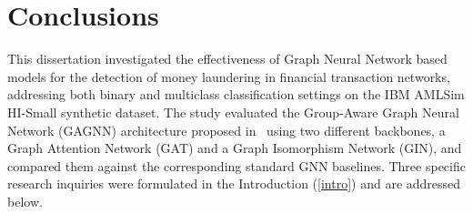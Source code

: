 \chapter{Conclusions}
\label{sec:concl}

This dissertation investigated the effectiveness of Graph Neural Network based models for the detection of money laundering in financial transaction networks, addressing both binary and multiclass classification settings on the IBM AMLSim HI-Small synthetic dataset. The study evaluated the Group-Aware Graph Neural Network (GAGNN) architecture proposed in~\cite{mainpaper} using two different backbones, a Graph Attention Network (GAT) and a Graph Isomorphism Network (GIN), and compared them against the corresponding standard GNN baselines. Three specific research inquiries were formulated in the Introduction (\ref{intro}) and are addressed below.

